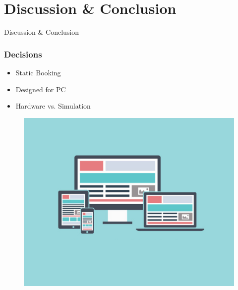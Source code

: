 \section{Discussion \& Conclusion}
\begin{frame}
\begin{center}
\Huge Discussion \& Conclusion
\end{center}
\end{frame}
\begin{frame}
\frametitle{Decisions}
\begin{itemize}
	\item Static Booking
	\item Designed for PC
	\item Hardware vs. Simulation
\end{itemize}
\begin{figure}
	\centering
	\includegraphics[scale=0.15]{Media/Web}
\end{figure}
\end{frame}

